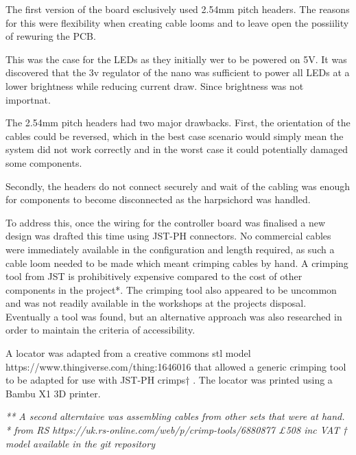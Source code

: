 The first version of the board esclusively used 2.54mm pitch headers.
The reasons for this were flexibility when creating cable looms and to
leave open the possiility of rewuring the PCB.

This was the case for the LEDs as they initially wer to be powered on
5V. It was discovered that the 3v regulator of the nano was sufficient
to power all LEDs at a lower brightness while reducing current draw.
Since brightness was not importnat.

The 2.54mm pitch headers had two major drawbacks. First, the orientation
of the cables could be reversed, which in the best case scenario would
simply mean the system did not work correctly and in the worst case it
could potentially damaged some components.

Secondly, the headers do not connect securely and wait of the cabling
was enough for components to become disconnected as the harpsichord was
handled.

To address this, once the wiring for the controller board was finalised
a new design was drafted this time using JST-PH connectors. No
commercial cables were immediately available in the configuration and
length required, as such a cable loom needed to be made which meant
crimping cables by hand. A crimping tool from JST is prohibitively
expensive compared to the cost of other components in the project*. The
crimping tool also appeared to be uncommon and was not readily available
in the workshops at the projects disposal. Eventually a tool was found,
but an alternative approach was also researched in order to maintain the
criteria of accessibility.

A locator was adapted from a creative commons stl model
https://www.thingiverse.com/thing:1646016 that allowed a generic
crimping tool to be adapted for use with JST-PH crimps† \figure{}. The
locator was printed using a Bambu X1 3D printer.

\emph{** A second alterntaive was assembling cables from other sets that
were at hand.} \emph{* from RS
https://uk.rs-online.com/web/p/crimp-tools/6880877 £508 inc VAT} \emph{†
model available in the git repository}

